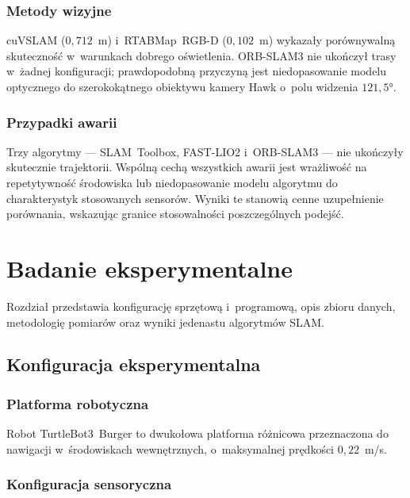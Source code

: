 \subsection{Metody wizyjne}

cuVSLAM ($0{,}712$~m) i~RTABMap~RGB-D ($0{,}102$~m) wykazały porównywalną
skuteczność w~warunkach dobrego oświetlenia.
ORB-SLAM3 nie ukończył trasy w~żadnej konfiguracji; prawdopodobną przyczyną
jest niedopasowanie modelu optycznego do szerokokątnego obiektywu kamery Hawk
o~polu widzenia $121{,}5°$.

\subsection{Przypadki awarii}

Trzy algorytmy --- SLAM~Toolbox, FAST-LIO2 i~ORB-SLAM3 --- nie ukończyły
skutecznie trajektorii.
Wspólną cechą wszystkich awarii jest wrażliwość na repetytywność środowiska
lub niedopasowanie modelu algorytmu do charakterystyk stosowanych sensorów.
Wyniki te stanowią cenne uzupełnienie porównania, wskazując granice
stosowalności poszczególnych podejść.



\chapter{Badanie eksperymentalne}

Rozdział przedstawia konfigurację sprzętową i~programową, opis zbioru danych,
metodologię pomiarów oraz wyniki jedenastu algorytmów SLAM.

\section{Konfiguracja eksperymentalna}

\subsection{Platforma robotyczna}

Robot TurtleBot3~Burger to dwukołowa platforma różnicowa przeznaczona do
nawigacji w~środowiskach wewnętrznych, o~maksymalnej prędkości $0{,}22$~m/s.

\subsection{Konfiguracja sensoryczna}

